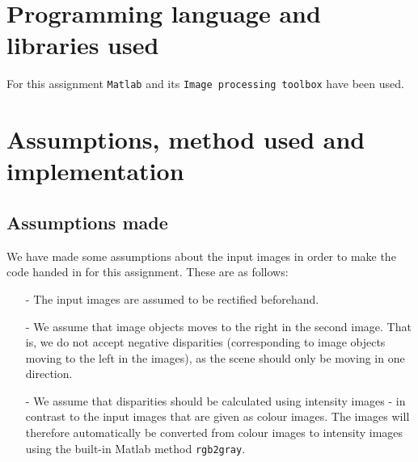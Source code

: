 \documentclass[12pt,a4paper,oneside,final]{article}
\begin{document}
\section{Programming language and libraries used}
For this assignment \texttt{Matlab} and its \texttt{Image processing toolbox} have been used.

\section{Assumptions, method used and implementation}

\subsection{Assumptions made}
We have made some assumptions about the input images in order to make the code handed in for this assignment. These are as follows:
\begin{itemize}
\item[-] The input images are assumed to be rectified beforehand.
\item[-] We assume that image objects moves to the right in the second image.  That is, we do not accept negative disparities (corresponding to image objects moving to the left in the images), as the scene should only be moving in one direction.
\item[-] We assume that disparities should be calculated using intensity images - in contrast to the input images that are given as colour images. The images will therefore automatically be converted from colour images to intensity images using the built-in Matlab method \texttt{rgb2gray}.
\end{itemize}
\end{document}
